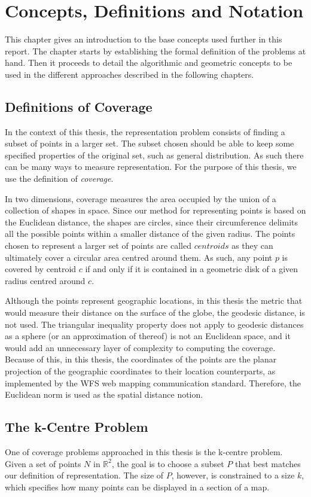 \cleardoublepage  
\chapter{Concepts, Definitions and Notation}
\label{chap:theory}
This chapter gives an introduction to the base concepts used further in this report.
The chapter starts by establishing the formal definition of the problems at hand. 
Then it proceeds to detail the algorithmic and geometric concepts to be used in the different approaches described in the following chapters.
\section{Definitions of Coverage}
\label{sect:problem}
In the context of this thesis, the representation problem consists of finding a subset of points in a larger set. The subset chosen should be able to keep some specified properties of the original set, such as general distribution. As such there can be many ways to measure representation. For the purpose of this thesis, we use the definition of \emph{coverage}.

In two dimensions, coverage measures the area occupied by the union of a collection of shapes in space.  Since our method for representing points is based on the Euclidean distance, the shapes are circles, since their circumference delimits all the possible points within a smaller distance of the given radius. The points chosen to represent a larger set of points are called $centroids$ as they can ultimately cover a circular area centred around them. As such, any point $p$ is covered by centroid $c$ if and only if it is contained in a geometric disk of a given radius centred around $c$.

Although the points represent geographic locations, in this thesis the metric that would measure their distance on the surface of the globe, the geodesic distance, is not used. The triangular inequality property does not apply to geodesic distances as a sphere (or an approximation of thereof) is not an Euclidean space, and it would add an unnecessary layer of complexity to computing the coverage.
Because of this, in this thesis, the coordinates of the points are the planar projection of the geographic coordinates to their location counterparts, as implemented by the WFS web mapping communication standard. Therefore, the Euclidean norm is used as the spatial distance notion.

\section{The k-Centre Problem}
\label{alg:ilp}
One of coverage problems approached in this thesis is the k-centre problem. Given a set of points $N$ in $\mathbb{R}^2$, the goal is to choose a subset $P$ that best matches our definition of representation.
The size of $P$, however, is constrained to a size $k$, which specifies how many points can be displayed in a section of a map.

